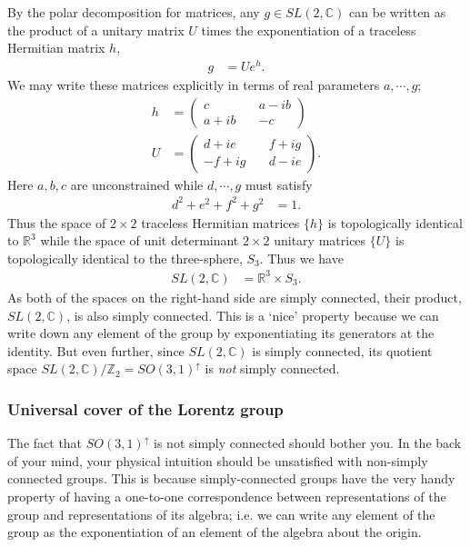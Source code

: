 \documentclass[12pt, oneside]{report}    %
\begin{document}
By the polar decomposition for matrices, any $g \in SL(2,\mathbb C)$ can be written as the product of a unitary matrix $U$ times the exponentiation of a traceless Hermitian matrix $h$,
\begin{align}
    g &= U e^{h}.
\end{align}
We may write these matrices explicitly in terms of real parameters $a,\cdots,g$;
\begin{align}
     h &= \begin{pmatrix}c \quad& a-ib\\ a+ib \quad& -c\end{pmatrix}\\
     U &= \begin{pmatrix}d+ie \quad& f+ig\\-f+ig \quad& d-ie\end{pmatrix}.
\end{align}
Here $a,b,c$ are unconstrained while $d,\cdots,g$ must satisfy
\begin{align}
    d^2+e^2+f^2+g^2 &= 1.
\end{align}
Thus the space of $2\times 2$ traceless Hermitian matrices $\{h\}$ is topologically identical to $\mathbb R^3$ while the space of unit determinant $2\times 2$ unitary matrices $\{U\}$ is topologically identical to the three-sphere, $S_3$. Thus we have
\begin{align}
    SL(2,\mathbb C) &= \mathbb R^3 \times S_3.
\end{align}
As both of the spaces on the right-hand side are simply connected, their product, $SL(2,\mathbb C)$, is also simply connected. This is a `nice' property because we can write down any element of the group by exponentiating its generators at the identity. But even further, since $SL(2,\mathbb C)$ is simply connected, its quotient space $SL(2,\mathbb C)/\mathbb Z_2 = SO(3,1)^\uparrow$ is \emph{not} simply connected.




\subsubsection{Universal cover of the Lorentz group}\label{sec:SUSYalg:universal:cover}

The fact that $SO(3,1)^\uparrow$ is not simply connected should bother you. In the back of your mind, your physical intuition should be unsatisfied with non-simply connected groups. This is because simply-connected groups have the very handy property of having a one-to-one correspondence between representations of the group and representations of its algebra; i.e. we can write any element of the group as the exponentiation of an element of the algebra about the origin. 
\end{document}
